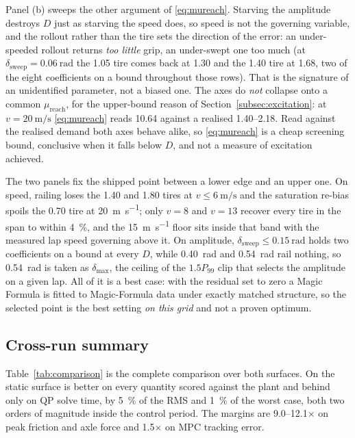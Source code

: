 Panel (b) sweeps the other argument of \eqref{eq:mureach}. Starving the
amplitude destroys $D$ just as starving the speed does, so speed is not the
governing variable, and the rollout rather than the tire sets the direction of
the error: an under-speeded rollout returns \emph{too little} grip, an
under-swept one too much (at $\delta_{\mathrm{sweep}}=\SI{0.06}{\radian}$ the
\num{1.05} tire comes back at \num{1.30} and the \num{1.40} tire at \num{1.68},
two of the eight coefficients on a bound throughout those rows). That is the
signature of an unidentified parameter, not a biased one. The axes do
\emph{not} collapse onto a common $\mu_{\mathrm{reach}}$, for the upper-bound
reason of Section~\ref{subsec:excitation}: at $v=\SI{20}{\meter\per\second}$
\eqref{eq:mureach} reads \num{10.64} against a realised
\numrange{1.40}{2.18}. Read against the realised demand both axes behave alike,
so \eqref{eq:mureach} is a cheap screening bound, conclusive when it falls
below $D$, and not a measure of excitation achieved.

The two panels fix the shipped point between a lower edge and an upper one. On
speed, railing loses the \num{1.40} and \num{1.80} tires at
$v\le\SI{6}{\meter\per\second}$ and the saturation re-bias spoils the
\num{0.70} tire at \SI{20}{\meter\per\second}; only $v=\num{8}$ and
$v=\num{13}$ recover every tire in the span to within \SI{4}{\percent}, and the
\SI{15}{\meter\per\second} floor sits inside that band with the measured lap
speed governing above it. On amplitude,
$\delta_{\mathrm{sweep}}\le\SI{0.15}{\radian}$ holds two coefficients on a
bound at every $D$, while \SI{0.40}{\radian} and \SI{0.54}{\radian} rail
nothing, so \SI{0.54}{\radian} is taken as $\delta_{\max}$, the ceiling of the
$1.5P_{99}$ clip that selects the amplitude on a given lap. All of it is a best
case: with the residual set to zero a Magic Formula is fitted to Magic-Formula
data under exactly matched structure, so the selected point is the best setting
\emph{on this grid} and not a proven optimum.

\subsection{Cross-run summary}
\label{subsec:summary}

Table~\ref{tab:comparison} is the complete comparison over both surfaces. On
the static surface \oursarm{} is better on every quantity scored against the
plant and behind only on QP solve time, by \SI{5}{\percent} of the RMS and
\SI{1}{\percent} of the worst case, both two orders of magnitude inside the
control period. The margins are \numrange{9.0}{12.1}$\times$ on peak friction
and axle force and \num{1.5}$\times$ on MPC tracking error.


